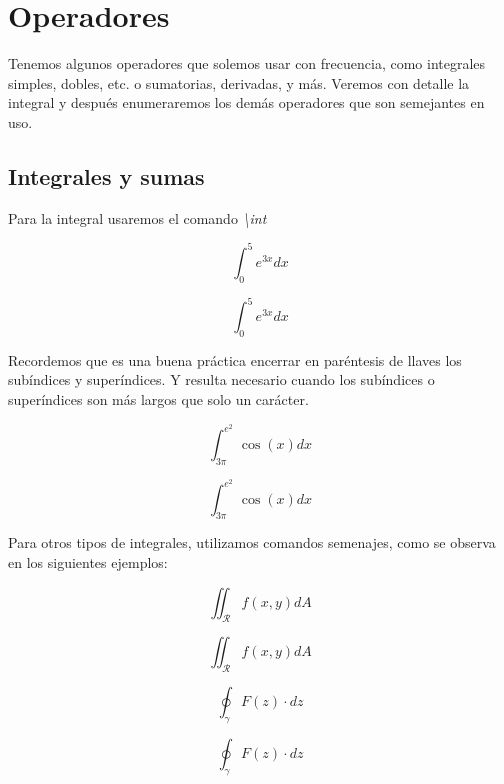 \documentclass[graybox,envcountchap,sectrefs]{svmono}
\begin{document}
    \section{Operadores}
        Tenemos algunos operadores que solemos usar con frecuencia, como integrales simples, dobles, etc. o sumatorias, 
        derivadas, y más. Veremos con detalle la integral y después enumeraremos los demás operadores que son semejantes en uso.

    \subsection{Integrales y sumas}
        Para la integral usaremos el comando \emph{\textbackslash int}

        \begin{code}
            \[\int_0^5 e^{3x}dx\]
        \end{code}
        \begin{compiled}
            \[\int_0^5 e^{3x}dx\]
        \end{compiled}

        Recordemos que es una buena práctica encerrar en paréntesis de llaves los subíndices y superíndices. Y resulta necesario cuando
        los subíndices o superíndices son más largos que solo un carácter.
        \begin{code}
            \[\int_{3\pi}^{e^2} \cos(x)dx\]
        \end{code}
        \begin{compiled}
            \[\int_{3\pi}^{e^2} \cos(x)dx\]
        \end{compiled}

        Para otros tipos de integrales, utilizamos comandos semenajes, como se observa en los siguientes ejemplos:


\begin{tcbraster}[raster columns=2, raster equal height]
        \begin{code}
            \[\iint_{\mathcal{R}} f(x,y)dA\]
        \end{code}
        \begin{compiled}
        \[\iint_{\mathcal{R}}f(x,y)dA\]
        \end{compiled}
    \end{tcbraster}

\begin{tcbraster}[raster columns=2, raster equal height]
        \begin{code}
            \[\oint_{\gamma} F(z)\cdot dz\]
        \end{code}
        \begin{compiled}
            \[\oint_{\gamma} F(z)\cdot dz\]
        \end{compiled}
    \end{tcbraster}
\end{document}

